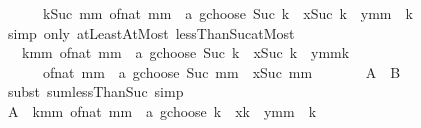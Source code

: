 \begin{isabellebody}
\ \ \ \ \ \ {\isacharparenleft}{\kern0pt}{\isasymSum}k{\isacharless}{\kern0pt}Suc\ mm{\isachardot}{\kern0pt}\ {\isacharparenleft}{\kern0pt}of{\isacharunderscore}{\kern0pt}nat\ mm\ {\isacharplus}{\kern0pt}\ a\ gchoose\ {\isacharparenleft}{\kern0pt}Suc\ k{\isacharparenright}{\kern0pt}{\isacharparenright}{\kern0pt}\ {\isacharasterisk}{\kern0pt}\ x{\isacharcircum}{\kern0pt}{\isacharparenleft}{\kern0pt}Suc\ k{\isacharparenright}{\kern0pt}\ {\isacharasterisk}{\kern0pt}\ y{\isacharcircum}{\kern0pt}{\isacharparenleft}{\kern0pt}mm\ {\isacharminus}{\kern0pt}\ k{\isacharparenright}{\kern0pt}{\isacharparenright}{\kern0pt}{\isachardoublequoteclose}\isanewline
\ \ \ \ \isamarkupfalse%
\ {\isacharparenleft}{\kern0pt}simp\ only{\isacharcolon}{\kern0pt}\ atLeast{}AtMost\ lessThan{\isacharunderscore}{\kern0pt}Suc{\isacharunderscore}{\kern0pt}atMost{\isacharparenright}{\kern0pt}\isanewline
\ \ \isamarkupfalse%
\ \isamarkupfalse%
\ {\isachardoublequoteopen}{\isasymdots}\ {\isacharequal}{\kern0pt}\ {\isacharparenleft}{\kern0pt}{\isasymSum}k{\isacharless}{\kern0pt}mm{\isachardot}{\kern0pt}\ {\isacharparenleft}{\kern0pt}of{\isacharunderscore}{\kern0pt}nat\ mm\ {\isacharplus}{\kern0pt}\ a\ gchoose\ Suc\ k{\isacharparenright}{\kern0pt}\ {\isacharasterisk}{\kern0pt}\ x{\isacharcircum}{\kern0pt}{\isacharparenleft}{\kern0pt}Suc\ k{\isacharparenright}{\kern0pt}\ {\isacharasterisk}{\kern0pt}\ y{\isacharcircum}{\kern0pt}{\isacharparenleft}{\kern0pt}mm{\isacharminus}{\kern0pt}k{\isacharparenright}{\kern0pt}{\isacharparenright}{\kern0pt}\ {\isacharplus}{\kern0pt}\isanewline
\ \ \ \ \ \ {\isacharparenleft}{\kern0pt}of{\isacharunderscore}{\kern0pt}nat\ mm\ {\isacharplus}{\kern0pt}\ a\ gchoose\ {\isacharparenleft}{\kern0pt}Suc\ mm{\isacharparenright}{\kern0pt}{\isacharparenright}{\kern0pt}\ {\isacharasterisk}{\kern0pt}\ x{\isacharcircum}{\kern0pt}{\isacharparenleft}{\kern0pt}Suc\ mm{\isacharparenright}{\kern0pt}{\isachardoublequoteclose}\isanewline
\ \ \ \ {\isacharparenleft}{\kern0pt}\ {\isachardoublequoteopen}{\isacharunderscore}{\kern0pt}\ {\isacharequal}{\kern0pt}\ {\isacharquery}{\kern0pt}A\ {\isacharplus}{\kern0pt}\ {\isacharquery}{\kern0pt}B{\isachardoublequoteclose}{\isacharparenright}{\kern0pt}\isanewline
\ \ \ \ \isamarkupfalse%
\ {\isacharparenleft}{\kern0pt}subst\ sum{\isachardot}{\kern0pt}lessThan{\isacharunderscore}{\kern0pt}Suc{\isacharparenright}{\kern0pt}\ simp\isanewline
\ \ \isamarkupfalse%
\ \isamarkupfalse%
\ {\isachardoublequoteopen}{\isacharquery}{\kern0pt}A\ {\isacharequal}{\kern0pt}\ {\isacharparenleft}{\kern0pt}{\isasymSum}k{\isacharequal}{\kern0pt}{}{\isachardot}{\kern0pt}{\isachardot}{\kern0pt}mm{\isachardot}{\kern0pt}\ {\isacharparenleft}{\kern0pt}of{\isacharunderscore}{\kern0pt}nat\ mm\ {\isacharplus}{\kern0pt}\ a\ gchoose\ k{\isacharparenright}{\kern0pt}\ {\isacharasterisk}{\kern0pt}\ x{\isacharcircum}{\kern0pt}k\ {\isacharasterisk}{\kern0pt}\ y{\isacharcircum}{\kern0pt}{\isacharparenleft}{\kern0pt}mm\ {\isacharminus}{\kern0pt}\ k\ {\isacharplus}{\kern0pt}\ {}{\isacharparenright}{\kern0pt}{\isacharparenright}{\kern0pt}{\isachardoublequoteclose}\isanewline

\end{isabellebody}
